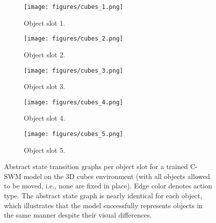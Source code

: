 \documentclass{article} %
\begin{document}
\begin{figure*}[htp]
\centering
  \begin{subfigure}[b]{0.18\textwidth}
  \centering
    \texttt{[image: figures/cubes\_1.png]}
    \caption{Object slot 1.}
  \end{subfigure}
  \begin{subfigure}[b]{0.18\textwidth}
  \centering
    \texttt{[image: figures/cubes\_2.png]}
    \caption{Object slot 2.}
  \end{subfigure}
  \begin{subfigure}[b]{0.18\textwidth}
  \centering
    \texttt{[image: figures/cubes\_3.png]}
    \caption{Object slot 3.}
  \end{subfigure}
  \begin{subfigure}[b]{0.18\textwidth}
  \centering
    \texttt{[image: figures/cubes\_4.png]}
    \caption{Object slot 4.}
  \end{subfigure}
  \begin{subfigure}[b]{0.18\textwidth}
  \centering
    \texttt{[image: figures/cubes\_5.png]}
    \caption{Object slot 5.}
  \end{subfigure}
  \caption{Abstract state transition graphs per object slot for a trained C-SWM model on the 3D cubes environment (with all objects allowed to be moved, i.e., none are fixed in place). Edge color denotes action type. The abstract state graph is nearly identical for each object, which illustrates that the model successfully represents objects in the same manner despite their visual differences.\label{fig:object_graphs_cubes}}
\end{figure*}
\end{document}
